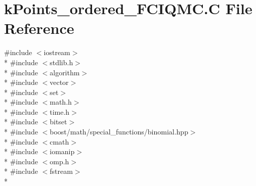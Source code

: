 \hypertarget{kPoints__ordered__FCIQMC_8C}{\section{k\-Points\-\_\-ordered\-\_\-\-F\-C\-I\-Q\-M\-C.\-C File Reference}
\label{kPoints__ordered__FCIQMC_8C}
}
{\ttfamily \#include $<$iostream$>$}\\*
{\ttfamily \#include $<$stdlib.\-h$>$}\\*
{\ttfamily \#include $<$algorithm$>$}\\*
{\ttfamily \#include $<$vector$>$}\\*
{\ttfamily \#include $<$set$>$}\\*
{\ttfamily \#include $<$math.\-h$>$}\\*
{\ttfamily \#include $<$time.\-h$>$}\\*
{\ttfamily \#include $<$bitset$>$}\\*
{\ttfamily \#include $<$boost/math/special\-\_\-functions/binomial.\-hpp$>$}\\*
{\ttfamily \#include $<$cmath$>$}\\*
{\ttfamily \#include $<$iomanip$>$}\\*
{\ttfamily \#include $<$omp.\-h$>$}\\*
{\ttfamily \#include $<$fstream$>$}\\*
